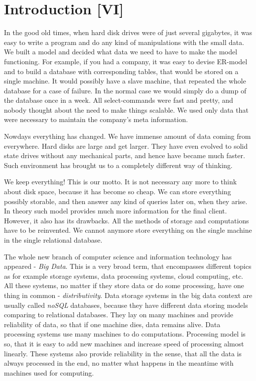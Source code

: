 \chapter{Introduction [VI]}
\label{chap:introduction}

In the good old times, when hard disk drives were of just several gigabytes, it was easy to write a program and do any kind of manipulations with the small data.
We built a model and decided what data we need to have to make the model functioning.
For example, if you had a company, it was easy to devise ER-model and to build a database with corresponding tables, that would be stored on a single machine.
It would possibly have a slave machine, that repeated the whole database for a case of failure.
In the normal case we would simply do a dump of the database once in a week.
All select-commands were fast and pretty, and nobody thought about the need to make things scalable.
We used only data that were necessary to maintain the company's meta information.

Nowdays everything has changed.
We have immense amount of data coming from everywhere.
Hard disks are large and get larger.
They have even evolved to solid state drives without any mechanical parts, and hence have became much faster.
Such environment has brought us to a completely different way of thinking.

We keep everything!
This is our motto.
It is not necessary any more to think about disk space, because it has become so cheap.
We can store everything possibly storable, and then answer any kind of queries later on, when they arise.
In theory such model provides much more information for the final client.
However, it also has its drawbacks.
All the methods of storage and computations have to be reinvented.
We cannot anymore store everything on the single machine in the single relational database.

The whole new branch of computer science and information technology has appeared - \textit{Big Data}.
This is a very broad term, that encompasses different topics as for example storage systems, data processing systems, cloud computing, etc.
All these systems, no matter if they store data or do some processing, have one thing in common - \textit{distributivity}.
Data storage systems in the big data context are usually called \textit{noSQL} databases, because they have different data storing models comparing to relational databases.
They lay on many machines and provide reliability of data, so that if one machine dies, data remains alive.
Data processing systems use many machines to do computations.
Processing model is so, that it is easy to add new machines and increase speed of processing almost linearly.
These systems also provide reliability in the sense, that all the data is always processed in the end, no matter what happens in the meantime with machines used for computing.

